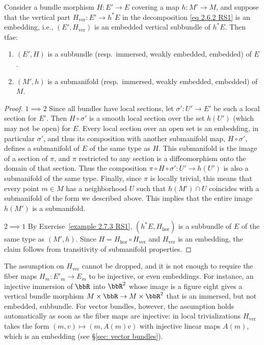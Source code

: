 \begin{prop}[{{cf.~\cite[Prop.~2.7.4]{RS1}}}]
    Consider a bundle morphism $H:E'\to E$ covering a map $h:M'\to M$, and suppose that the vertical part $H_{\mathrm{ver}}:E'\to h^\ast E$ in the decomposition \eqref{eq 2.6.2 RS1} is an embedding, i.e., $(E',H_{\mathrm{ver}})$ is an embedded vertical subbundle of $h^\ast E$. Then \gls{tfae}:
    \begin{enumerate}
        \item $(E',H)$ is a subbundle (resp.~immersed, weakly embedded, embedded) of $E$.
        \item $(M',h)$ is a submanifold (resp.~immersed, weakly embedded, embedded) of $M$.
    \end{enumerate}
\end{prop}
\begin{proof}
    $1\implies 2$ Since all bundles have local sections, let $\sigma':U'\to E'$ be such a local section for $E'$. Then $H\circ\sigma'$ is a smooth local section over the set $h(U')$ (which may not be open) for $E$. Every local section over an open set is an embedding, in particular $\sigma'$, and thus its composition with another submanifold map, $H\circ \sigma'$, defines a submanifold of $E$ of the same type as $H$. This submanifold is the image of a section of $\pi$, and $\pi$ restricted to any section is a diffeomorphism onto the domain of that section. Thus the composition $\pi\circ H\circ \sigma':U'\to h(U')$ is also a submanifold of the same type. Finally, since $\pi$ is locally trivial, this means that every point $m\in M$ has a neighborhood $U$ such that $h(M')\cap U$ coincides with a submanifold of the form we described above. This implies that the entire image $h(M')$ is a submanifold.
    
    $2\implies 1$ By Exercise~\ref{example 2.7.3 RS1}, $(h^\ast E,H_{\mathrm{hor}})$ is a subbundle of $E$ of the same type as $(M',h)$. Since $H=H_{\mathrm{hor}}\circ H_{\mathrm{ver}}$ and $H_{\mathrm{ver}}$ is an embedding, the claim follows from transitivity of submanifold properties.
\end{proof}
\begin{rem}
    The assumption on $H_{\mathrm{ver}}$ cannot be dropped, and it is not enough to require the fiber maps $H_m:E'_m\to E_m$ to be injective, or even embeddings. For instance, an injective immersion of $\bbR$ into $\bbR^2$ whose image is a figure eight gives a vertical bundle morphism $M\times \bbR\to M\times\bbR^2$ that is an immersed, but not embedded, subbundle. For vector bundles, however, the assumption holds automatically as soon as the fiber maps are injective: in local trivializations $H_{\mathrm{ver}}$ takes the form $(m,v)\mapsto (m,A(m)v)$ with injective linear maps $A(m)$, which is an embedding (see \S\ref{sec: vector bundles}).
\end{rem}




